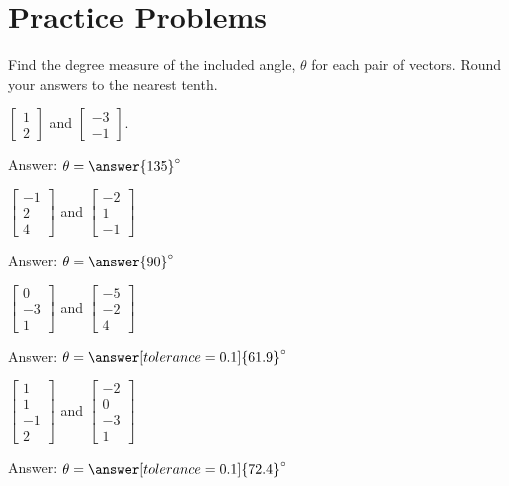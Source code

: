 \documentclass{ximera}
\author{Zack Reed}
\begin{document}
\section*{Practice Problems}
\begin{problem}%
Find the degree measure of the included angle, $\theta$ for each pair of vectors.  Round your answers to the nearest tenth.
  \begin{problem}\label{prob:anglebetweenvectors1}
  $\begin{bmatrix}1\\2\end{bmatrix}$ and $\begin{bmatrix}-3\\-1\end{bmatrix}$.
   
  Answer: $\theta=\answer{135}^\circ$
  \end{problem}
   
  \begin{problem}\label{prob:anglebetweenvectors2}
  $\begin{bmatrix}-1\\2\\4\end{bmatrix}$ and $\begin{bmatrix}-2\\1\\-1\end{bmatrix}$
   
   Answer: $\theta=\answer{90}^\circ$
  \end{problem}
 
\begin{problem}\label{prob:anglebetweenvectors3}
  $\begin{bmatrix}0\\-3\\1\end{bmatrix}$ and $\begin{bmatrix}-5\\-2\\4\end{bmatrix}$
   
   Answer: $\theta=\answer[tolerance=0.1]{61.9}^\circ$
  \end{problem}
 
\begin{problem}\label{prob:anglebetweenvectors4}
  $\begin{bmatrix}1\\1\\-1\\2\end{bmatrix}$ and $\begin{bmatrix}-2\\0\\-3\\1\end{bmatrix}$
   
   Answer: $\theta=\answer[tolerance=0.1]{72.4}^\circ$
  \end{problem}
   
  \end{problem}
 
\end{document}
